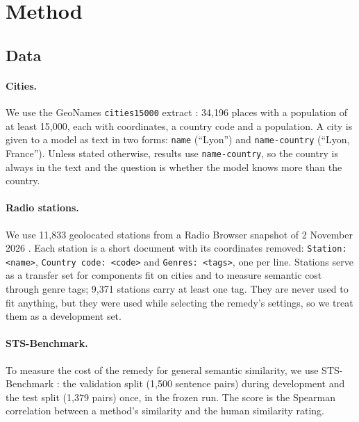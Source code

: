 \section{Method}
\label{sec:method}

\subsection{Data}
\label{sec:method-data}

\paragraph{Cities.}
We use the GeoNames \texttt{cities15000} extract \citep{geonames}: 34,196 places with a population of at least 15,000, each with coordinates, a country code and a population. A city is given to a model as text in two forms: \texttt{name} (``Lyon'') and \texttt{name-country} (``Lyon, France''). Unless stated otherwise, results use \texttt{name-country}, so the country is always in the text and the question is whether the model knows more than the country.

\paragraph{Radio stations.}
We use 11,833 geolocated stations from a Radio Browser snapshot of 2 November 2026 \citep{radiobrowser}. Each station is a short document with its coordinates removed: \texttt{Station: <name>}, \texttt{Country code: <code>} and \texttt{Genres: <tags>}, one per line. Stations serve as a transfer set for components fit on cities and to measure semantic cost through genre tags; 9,371 stations carry at least one tag. They are never used to fit anything, but they were used while selecting the remedy's settings, so we treat them as a development set.

\paragraph{STS-Benchmark.}
To measure the cost of the remedy for general semantic similarity, we use STS-Benchmark \citep{cer2017semeval}: the validation split (1,500 sentence pairs) during development and the test split (1,379 pairs) once, in the frozen run. The score is the Spearman correlation between a method's similarity and the human similarity rating.

